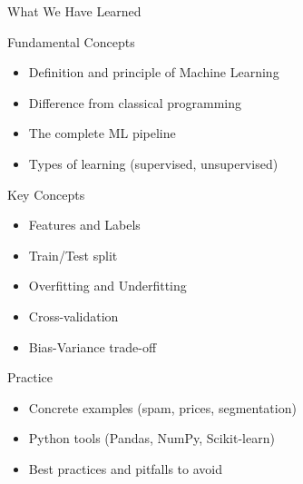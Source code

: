 \documentclass[12pt,aspectratio=169]{beamer}
\begin{document}
\begin{frame}{What We Have Learned}
\begin{block}{Fundamental Concepts}
\begin{itemize}
\item Definition and principle of Machine Learning
\item Difference from classical programming
\item The complete ML pipeline
\item Types of learning (supervised, unsupervised)
\end{itemize}
\end{block}

\begin{block}{Key Concepts}
\begin{itemize}
\item Features and Labels
\item Train/Test split
\item Overfitting and Underfitting
\item Cross-validation
\item Bias-Variance trade-off
\end{itemize}
\end{block}

\begin{block}{Practice}
\begin{itemize}
\item Concrete examples (spam, prices, segmentation)
\item Python tools (Pandas, NumPy, Scikit-learn)
\item Best practices and pitfalls to avoid
\end{itemize}
\end{block}
\end{frame}
\end{document}
